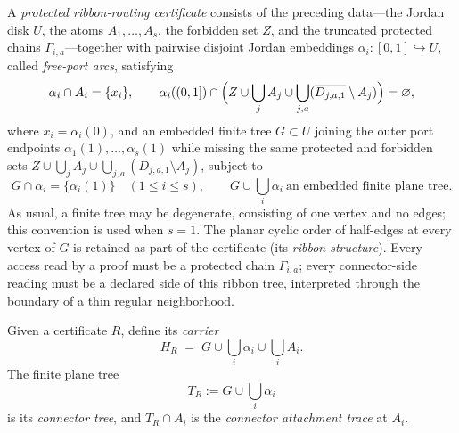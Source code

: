 \begin{definition}\label{def:certificate}
A \emph{protected ribbon-routing certificate} consists of the preceding
data---the Jordan disk $U$, the atoms $A_1,\dots,A_s$, the forbidden set
$Z$, and the truncated protected chains $\Gamma_{i,a}$---together with
pairwise disjoint Jordan embeddings
$\alpha_i\colon[0,1]\hookrightarrow U$, called \emph{free-port arcs},
satisfying
\[
\alpha_i\cap A_i=\{x_i\},\qquad
\alpha_i((0,1])\cap
\Bigl(Z\cup\bigcup_{j}A_j\cup
\bigcup_{j,a}(\overline{D_{j,a,1}}\setminus A_j)\Bigr)=\varnothing,
\]
where $x_i=\alpha_i(0)$, and an embedded finite tree $G\subset U$ joining
the outer port endpoints $\alpha_1(1),\dots,\alpha_s(1)$ while missing the
same protected and forbidden sets
$Z\cup\bigcup_jA_j\cup
\bigcup_{j,a}(\overline{D_{j,a,1}}\setminus A_j)$, subject to
\[
 G\cap\alpha_i=\{\alpha_i(1)\}\quad(1\le i\le s),
 \qquad
 G\cup\bigcup_i\alpha_i\ \text{an embedded finite plane tree}.
\]
As usual, a finite tree may be degenerate, consisting of one vertex and no
edges; this convention is used when $s=1$.
The planar cyclic order of
half-edges at every vertex of $G$ is retained as part of the certificate
(its \emph{ribbon structure}).  Every access read by a proof must be a
protected chain $\Gamma_{i,a}$; every connector-side reading must be a
declared side of this ribbon tree, interpreted through the boundary of a
thin regular neighborhood.
\end{definition}

Given a certificate $R$, define its \emph{carrier}
\begin{equation}\label{eq:C-HR}
H_R \;=\; G\cup\bigcup_i\alpha_i\cup\bigcup_iA_i .
\end{equation}
The finite plane tree
\[
T_R:=G\cup\bigcup_i\alpha_i
\]
is its \emph{connector tree}, and $T_R\cap A_i$ is the
\emph{connector attachment trace} at $A_i$.

